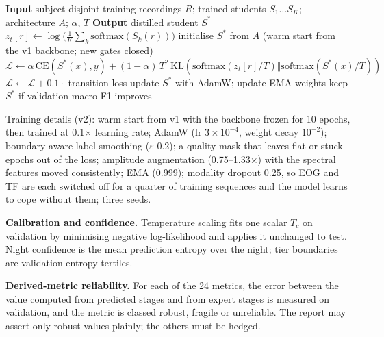 \begin{algorithm}[htbp]
\caption{Ensemble-teacher distillation of the staging student}\label{alg:kd}
\begin{algorithmic}[1]
\State \textbf{Input} subject-disjoint training recordings $R$; trained students $S_1 \ldots S_K$; architecture $A$; $\alpha$, $T$
\State \textbf{Output} distilled student $S^*$
  \State $z_t[r] \gets \log\!\big(\tfrac{1}{K}\sum_k \mathrm{softmax}(S_k(r))\big)$ 
\EndFor
\State initialise $S^*$ from $A$ (warm start from the v1 backbone; new gates closed)
    \State $\mathcal{L} \gets \alpha\,\mathrm{CE}(S^*(x), y) + (1-\alpha)\,T^2\,\mathrm{KL}(\mathrm{softmax}(z_t[r]/T) \Vert \mathrm{softmax}(S^*(x)/T))$
    \State $\mathcal{L} \gets \mathcal{L} + 0.1 \cdot$ transition loss 
    \State update $S^*$ with AdamW; update EMA weights
  \EndFor
  \State keep $S^*$ if validation macro-F1 improves 
\EndFor
\end{algorithmic}
\end{algorithm}

Training details (v2): warm start from v1 with the backbone frozen for 10 epochs, then trained at 0.1$\times$
learning rate; AdamW (lr $3\times10^{-4}$, weight decay $10^{-2}$); boundary-aware label smoothing ($\varepsilon$
0.2); a quality mask that leaves flat or stuck epochs out of the loss; amplitude augmentation (0.75--1.33$\times$)
with the spectral features moved consistently; EMA (0.999); modality dropout 0.25, so EOG and TF are each switched
off for a quarter of training sequences and the model learns to cope without them; three seeds.

\textbf{Calibration and confidence.} Temperature scaling fits one scalar $T_c$ on validation by minimising negative
log-likelihood and applies it unchanged to test. Night confidence is the mean prediction entropy over the night;
tier boundaries are validation-entropy tertiles.

\textbf{Derived-metric reliability.} For each of the 24 metrics, the error between the value computed from
predicted stages and from expert stages is measured on validation, and the metric is classed robust, fragile or
unreliable. The report may assert only robust values plainly; the others must be hedged.

